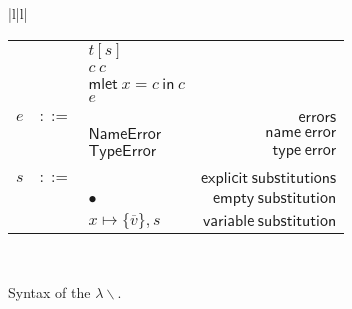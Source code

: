 \documentclass[preprint,authoryear,sort&compress,9pt,nocopyrightspace]{article}
\newcommand{\subx}{x \mapsto \{\overline{v}\},s}
\newcommand{\oletP}[3]{\mathsf{mlet} \ x = #2 \ \mathsf{in}  \ #3}
\newcommand{\nameerror}{\mathsf{NameError}}
\newcommand{\typeerror}{\mathsf{TypeError}}
\newcommand{\semanticA}{$\lambda\backslash$}
\begin{document}
\begin{figure}[h]
\begin{small}
\begin{center}
\begin{tabular}{|l|l|}
\begin{tabular}{l c l r}
&&$t[s]$&\\
&&$c \ c $&\\
&&$\oletP {T}{c}{c}$&\\
&&$e$&\\
&&&\\
$e$&$::=$&&$\mathsf {errors}$\\
&&$\nameerror$&$\mathsf {name \ error}$\\
&&$\typeerror$&$\mathsf {type \ error}$\\
&&&\\
$s$&$::=$&&$\mathsf {explicit \ substitutions}$\\
&&$ \bullet$&$\mathsf {empty \ substitution}$\\
&&$\subx$&$\mathsf {variable \ substitution}$\\
\end{tabular}\\
\hline
\end{tabular}
\hspace*{-2cm}
\caption{Syntax of the \semanticA.}
\label{figure:sintax1}
\end{center}
\end{small}
\end{figure}
\end{document}
